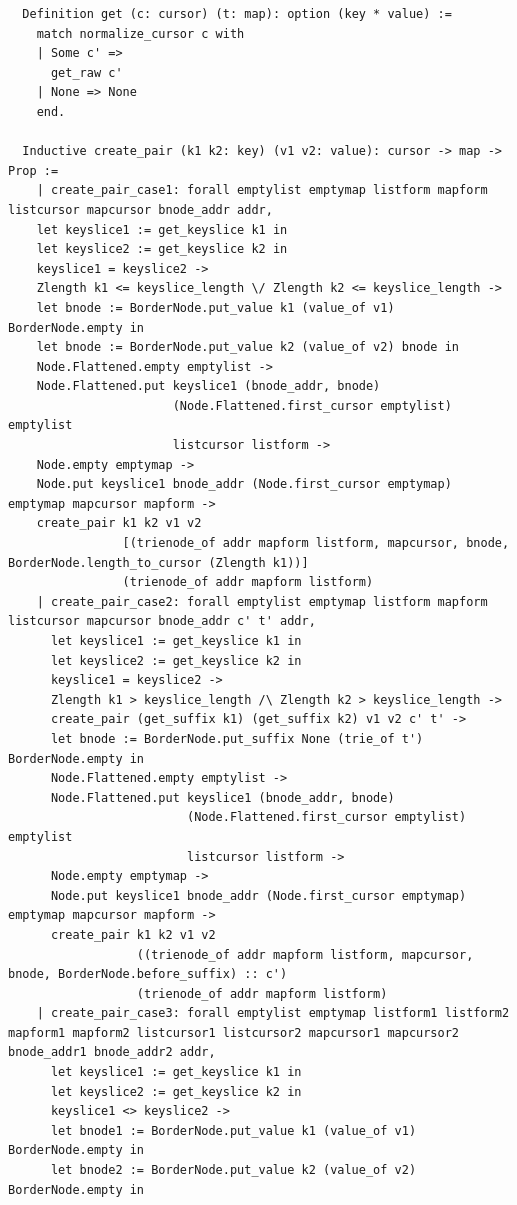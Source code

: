 \documentclass[runningheads]{llncs}
\begin{document}
\begin{verbatim}
  Definition get (c: cursor) (t: map): option (key * value) :=
    match normalize_cursor c with
    | Some c' =>
      get_raw c'
    | None => None
    end.

  Inductive create_pair (k1 k2: key) (v1 v2: value): cursor -> map -> Prop :=
    | create_pair_case1: forall emptylist emptymap listform mapform listcursor mapcursor bnode_addr addr,
    let keyslice1 := get_keyslice k1 in
    let keyslice2 := get_keyslice k2 in
    keyslice1 = keyslice2 ->
    Zlength k1 <= keyslice_length \/ Zlength k2 <= keyslice_length ->
    let bnode := BorderNode.put_value k1 (value_of v1) BorderNode.empty in
    let bnode := BorderNode.put_value k2 (value_of v2) bnode in
    Node.Flattened.empty emptylist ->
    Node.Flattened.put keyslice1 (bnode_addr, bnode)
                       (Node.Flattened.first_cursor emptylist) emptylist
                       listcursor listform ->
    Node.empty emptymap ->
    Node.put keyslice1 bnode_addr (Node.first_cursor emptymap) emptymap mapcursor mapform ->
    create_pair k1 k2 v1 v2
                [(trienode_of addr mapform listform, mapcursor, bnode, BorderNode.length_to_cursor (Zlength k1))]
                (trienode_of addr mapform listform)
    | create_pair_case2: forall emptylist emptymap listform mapform listcursor mapcursor bnode_addr c' t' addr,
      let keyslice1 := get_keyslice k1 in
      let keyslice2 := get_keyslice k2 in
      keyslice1 = keyslice2 ->
      Zlength k1 > keyslice_length /\ Zlength k2 > keyslice_length ->
      create_pair (get_suffix k1) (get_suffix k2) v1 v2 c' t' ->
      let bnode := BorderNode.put_suffix None (trie_of t') BorderNode.empty in
      Node.Flattened.empty emptylist ->
      Node.Flattened.put keyslice1 (bnode_addr, bnode)
                         (Node.Flattened.first_cursor emptylist) emptylist
                         listcursor listform ->
      Node.empty emptymap ->
      Node.put keyslice1 bnode_addr (Node.first_cursor emptymap) emptymap mapcursor mapform ->
      create_pair k1 k2 v1 v2
                  ((trienode_of addr mapform listform, mapcursor, bnode, BorderNode.before_suffix) :: c')
                  (trienode_of addr mapform listform)
    | create_pair_case3: forall emptylist emptymap listform1 listform2 mapform1 mapform2 listcursor1 listcursor2 mapcursor1 mapcursor2 bnode_addr1 bnode_addr2 addr,
      let keyslice1 := get_keyslice k1 in
      let keyslice2 := get_keyslice k2 in
      keyslice1 <> keyslice2 ->
      let bnode1 := BorderNode.put_value k1 (value_of v1) BorderNode.empty in
      let bnode2 := BorderNode.put_value k2 (value_of v2) BorderNode.empty in

\end{verbatim}
\end{document}

